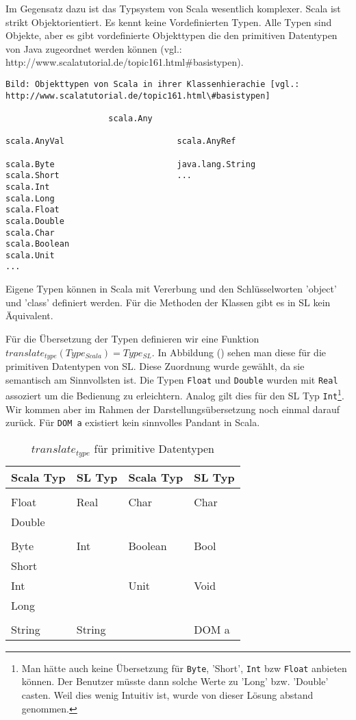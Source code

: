 \documentclass[12pt]{scrreprt}
\begin{document}
Im Gegensatz dazu ist das Typsystem von Scala wesentlich komplexer. Scala ist strikt Objektorientiert. Es kennt keine Vordefinierten Typen. Alle Typen sind Objekte, aber es gibt vordefinierte Objekttypen die den primitiven Datentypen von Java zugeordnet werden können (vgl.: http://www.scalatutorial.de/topic161.html\#basistypen).

\begin{lstlisting}
Bild: Objekttypen von Scala in ihrer Klassenhierachie [vgl.: http://www.scalatutorial.de/topic161.html\#basistypen]

                     scala.Any

scala.AnyVal                       scala.AnyRef

scala.Byte                         java.lang.String
scala.Short                        ...
scala.Int
scala.Long
scala.Float
scala.Double
scala.Char
scala.Boolean
scala.Unit
...
\end{lstlisting}

Eigene Typen können in Scala mit Vererbung und den Schlüsselworten 'object' und 'class' definiert werden. Für die Methoden der Klassen gibt es in \ac{SL} kein Äquivalent.

Für die Übersetzung der Typen definieren wir eine Funktion $translate_{type}(Type_{Scala}) = Type_{SL}$. In Abbildung () sehen man diese für die primitiven Datentypen von \ac{SL}. Diese Zuordnung wurde gewählt, da sie semantisch am Sinnvollsten ist. Die Typen \lstinline!Float! und \lstinline!Double! wurden mit \lstinline!Real! assoziert um die Bedienung zu erleichtern. Analog gilt dies für den \ac{SL} Typ \lstinline!Int!\footnote{Man hätte auch keine Übersetzung für \lstinline!Byte!, 'Short', \lstinline!Int! bzw \lstinline!Float! anbieten können. Der Benutzer müsste dann solche Werte zu 'Long' bzw. 'Double' casten. Weil dies wenig Intuitiv ist, wurde von dieser Lösung abstand genommen.}. Wir kommen aber im Rahmen der Darstellungsübersetzung noch einmal darauf zurück. Für \lstinline!DOM a! existiert kein sinnvolles Pandant in Scala.

\begin{table}
\caption{$translate_{type}$ für primitive Datentypen}
\centering
\begin{tabular}{ll|ll}
Scala Typ & \ac{SL} Typ & Scala Typ & \ac{SL} Typ \\
\hline
\\
 Float & Real & Char & Char\\
   Double   &  \\
      &&&\\
Byte  &   Int & Boolean & Bool \\
 Short     &  \\
 Int    &  & Unit &  Void\\
  Long   &  \\
     &&&\\
 String & String &  & DOM a \\

\end{tabular}
\end{table}
\end{document}
